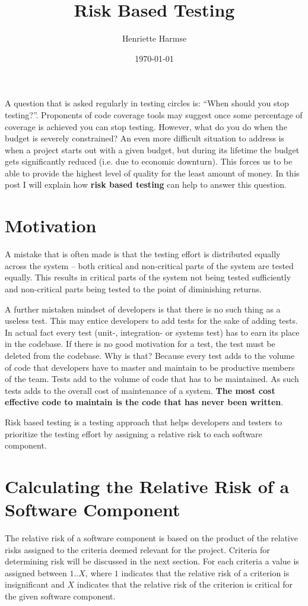 \documentclass{amsart}
\title{Risk Based Testing}
\author{Henriette Harmse}
\date{\today}
\begin{document}
  \maketitle

  A question that is asked regularly in testing circles is: ``When should you stop testing?''. Proponents of code coverage tools may suggest once some percentage of coverage is achieved you can stop testing. However, what do you do when the budget is severely constrained? An even more difficult situation to address is when a project starts out with a given budget, but during its lifetime the budget gets significantly reduced (i.e. due to economic downturn). This forces us to be able to provide the highest level of quality for the least amount of money. In this post I will explain how \textbf{risk based testing} can help to answer this question.

\section{Motivation}
A mistake that is often made is that the testing effort is distributed equally across the system – both
critical and non-critical parts of the system are tested equally. This results in critical parts of the
system not being tested sufficiently and non-critical parts being tested to the point of diminishing
returns. 

A further mistaken mindset of developers is that there is no such thing as a useless test. This may entice developers to add tests for the sake of adding tests. In actual fact every test (unit-, integration- or systems test) has to earn its place in the codebase. If there is no good motivation for a test, the test must be deleted from the codebase. Why is that? Because every test  adds to the volume of code that developers have to master and maintain to be productive members of the team. Tests add to the volume of code that has to be maintained. As such tests adds to the overall cost of maintenance of a system. \textbf{The most cost effective code to maintain is the code that has never been written}. 

Risk based testing is a testing approach that helps developers and testers to prioritize the testing effort by assigning a relative risk to each software component. 

\section{Calculating the Relative Risk of a Software Component}
The relative risk of a software component is based on the product of the relative risks assigned to the criteria deemed relevant for the project. Criteria for determining risk will be discussed in the next section. For each criteria a value is assigned between $1..X$, where $1$ indicates that the relative risk of a criterion is insignificant and $X$ indicates that the relative risk of the criterion is critical for the given software component. 
\end{document}
